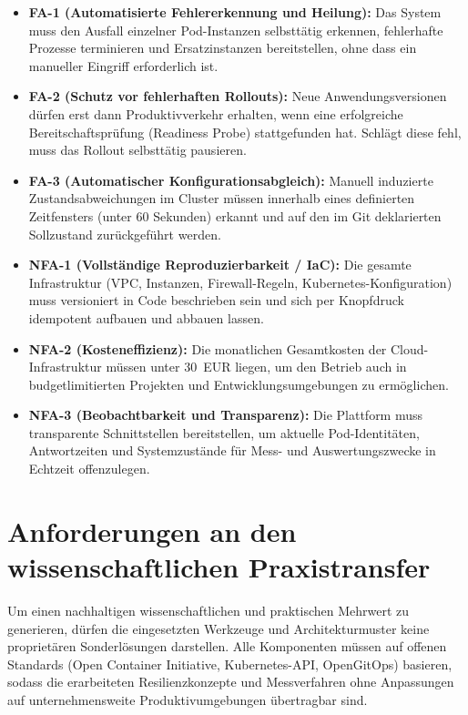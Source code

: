 \begin{itemize}
    \item \textbf{FA-1 (Automatisierte Fehlererkennung und Heilung):} Das System muss den Ausfall einzelner Pod-Instanzen selbsttätig erkennen, fehlerhafte Prozesse terminieren und Ersatzinstanzen bereitstellen, ohne dass ein manueller Eingriff erforderlich ist.
    \item \textbf{FA-2 (Schutz vor fehlerhaften Rollouts):} Neue Anwendungsversionen dürfen erst dann Produktivverkehr erhalten, wenn eine erfolgreiche Bereitschaftsprüfung (Readiness Probe) stattgefunden hat. Schlägt diese fehl, muss das Rollout selbsttätig pausieren.
    \item \textbf{FA-3 (Automatischer Konfigurationsabgleich):} Manuell induzierte Zustandsabweichungen im Cluster müssen innerhalb eines definierten Zeitfensters (unter 60 Sekunden) erkannt und auf den im Git deklarierten Sollzustand zurückgeführt werden.
    \item \textbf{NFA-1 (Vollständige Reproduzierbarkeit / IaC):} Die gesamte Infrastruktur (VPC, Instanzen, Firewall-Regeln, Kubernetes-Konfiguration) muss versioniert in Code beschrieben sein und sich per Knopfdruck idempotent aufbauen und abbauen lassen.
    \item \textbf{NFA-2 (Kosteneffizienz):} Die monatlichen Gesamtkosten der Cloud-Infrastruktur müssen unter 30~EUR liegen, um den Betrieb auch in budgetlimitierten Projekten und Entwicklungsumgebungen zu ermöglichen.
    \item \textbf{NFA-3 (Beobachtbarkeit und Transparenz):} Die Plattform muss transparente Schnittstellen bereitstellen, um aktuelle Pod-Identitäten, Antwortzeiten und Systemzustände für Mess- und Auswertungszwecke in Echtzeit offenzulegen.
\end{itemize}

\section{Anforderungen an den wissenschaftlichen Praxistransfer}
\label{sec:anforderungen-praxistransfer}
Um einen nachhaltigen wissenschaftlichen und praktischen Mehrwert zu generieren, dürfen die eingesetzten Werkzeuge und Architekturmuster keine proprietären Sonderlösungen darstellen. Alle Komponenten müssen auf offenen Standards (Open Container Initiative, Kubernetes-API, OpenGitOps) basieren, sodass die erarbeiteten Resilienzkonzepte und Messverfahren ohne Anpassungen auf unternehmensweite Produktivumgebungen übertragbar sind.
